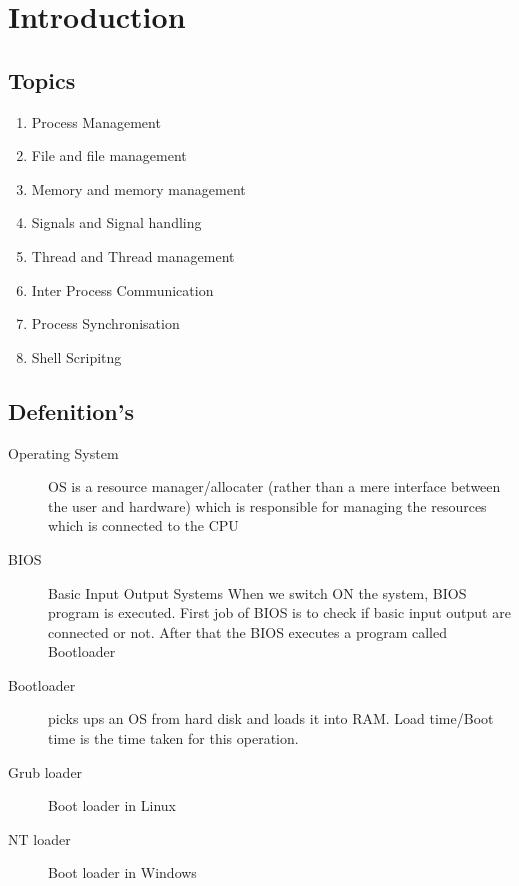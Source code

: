 \documentclass[11pt,fleqn]{book} %
\begin{document}

\chapter{Introduction}

\section{Topics}

\begin{enumerate}
	\item Process Management
	\item File and file management
	\item Memory and memory management
	\item Signals and Signal handling
	\item Thread and Thread management
	\item Inter Process Communication
	\item Process Synchronisation
	\item Shell Scripitng
\end{enumerate}

\section{Defenition's}

\begin{description}
\item[Operating System] OS is a resource manager/allocater (rather than a mere interface between the user and hardware) which is responsible for managing the resources which is connected to the CPU

\item[BIOS] Basic Input Output Systems
When we switch ON the system, BIOS program is executed. First job of BIOS is to check if basic input output are connected or not. After that the BIOS executes a program called Bootloader

\item[Bootloader] picks ups an OS from hard disk and loads it into RAM. Load time/Boot time is the time taken for this operation.

\item[Grub loader] Boot loader in Linux
\item[NT loader] Boot loader in Windows
\end{description}
\end{document}
